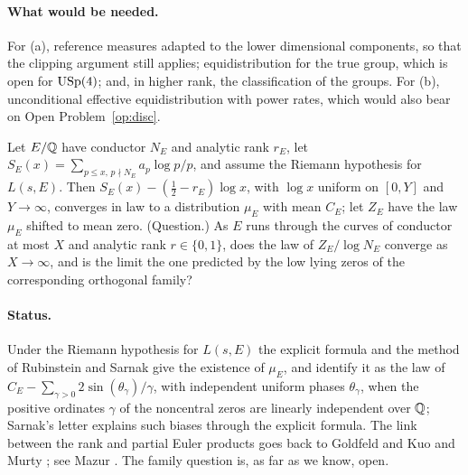 \paragraph{What would be needed.} For (a), reference measures adapted to the lower dimensional components, so that the clipping argument still applies; equidistribution for the true group, which is open for $\mathrm{USp}(4)$; and, in higher rank, the classification of the groups. For (b), unconditional effective equidistribution with power rates, which would also bear on Open Problem~\ref{op:disc}.

\begin{problem}\label{op:rankbias}
Let $E/\mathbb{Q}$ have conductor $N_E$ and analytic rank $r_E$, let $S_E(x)=\sum_{p\le x,\,p\nmid N_E}a_p\log p/p$, and assume the Riemann hypothesis for $L(s,E)$. Then $S_E(x)-(\tfrac12-r_E)\log x$, with $\log x$ uniform on $[0,Y]$ and $Y\to\infty$, converges in law to a distribution $\mu_E$ with mean $C_E$; let $Z_E$ have the law $\mu_E$ shifted to mean zero. (Question.) As $E$ runs through the curves of conductor at most $X$ and analytic rank $r\in\{0,1\}$, does the law of $Z_E/\log N_E$ converge as $X\to\infty$, and is the limit the one predicted by the low lying zeros of the corresponding orthogonal family?
\end{problem}

\paragraph{Status.} Under the Riemann hypothesis for $L(s,E)$ the explicit formula and the method of Rubinstein and Sarnak \cite{rubinsteinsarnak1994} give the existence of $\mu_E$, and identify it as the law of $C_E-\sum_{\gamma>0}2\sin(\theta_\gamma)/\gamma$, with independent uniform phases $\theta_\gamma$, when the positive ordinates $\gamma$ of the noncentral zeros are linearly independent over $\mathbb{Q}$; Sarnak's letter \cite{sarnak2007} explains such biases through the explicit formula. The link between the rank and partial Euler products goes back to Goldfeld \cite{goldfeld1982} and Kuo and Murty \cite{kuomurty2005}; see Mazur \cite{mazur2008}. The family question is, as far as we know, open.

